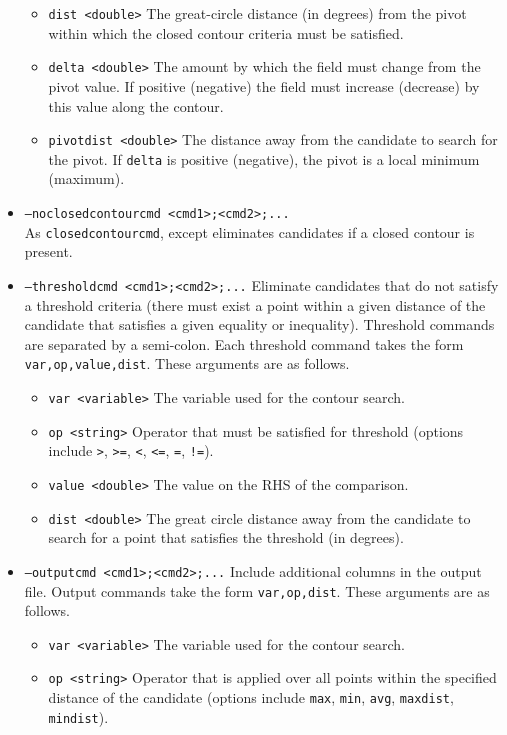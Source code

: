 \documentclass[gmdd, hvmath, online]{copernicus_discussions}
\begin{document}
\begin{itemize}
\begin{itemize}
\item[] \texttt{dist <double>}  The great-circle distance (in degrees) from the pivot within which the closed contour criteria must be satisfied.
\item[] \texttt{delta <double>}  The amount by which the field must change from the pivot value.  If positive (negative) the field must increase (decrease) by this value along the contour.
\item[] \texttt{pivotdist <double>}  The distance away from the candidate to search for the pivot.  If \texttt{delta} is positive (negative), the pivot is a local minimum (maximum).
\end{itemize}
\item[] \texttt{--noclosedcontourcmd <cmd1>;<cmd2>;...} \\ As \texttt{closedcontourcmd}, except eliminates candidates if a closed contour is present.
\item[] \texttt{--thresholdcmd <cmd1>;<cmd2>;...}  Eliminate candidates that do not satisfy a threshold criteria (there must exist a point within a given distance of the candidate that satisfies a given equality or inequality).  Threshold commands are separated by a semi-colon.  Each threshold command takes the form \texttt{var,op,value,dist}.  These arguments are as follows.
\begin{itemize}
\item[] \texttt{var <variable>}  The variable used for the contour search.
\item[] \texttt{op <string>}  Operator that must be satisfied for threshold (options include \texttt{>}, \texttt{>=}, \texttt{<}, \texttt{<=}, \texttt{=}, \texttt{!=}).
\item[] \texttt{value <double>}  The value on the RHS of the comparison.
\item[] \texttt{dist <double>}  The great circle distance away from the candidate to search for a point that satisfies the threshold (in degrees).
\end{itemize}
\item[] \texttt{--outputcmd <cmd1>;<cmd2>;...}  Include additional columns in the output file.  Output commands take the form \texttt{var,op,dist}. These arguments are as follows.
\begin{itemize}
\item[] \texttt{var <variable>}  The variable used for the contour search.
\item[] \texttt{op <string>}  Operator that is applied over all points within the specified distance of the candidate (options include \texttt{max}, \texttt{min}, \texttt{avg}, \texttt{maxdist}, \texttt{mindist}).

\end{itemize}
\end{itemize}
\end{document}

